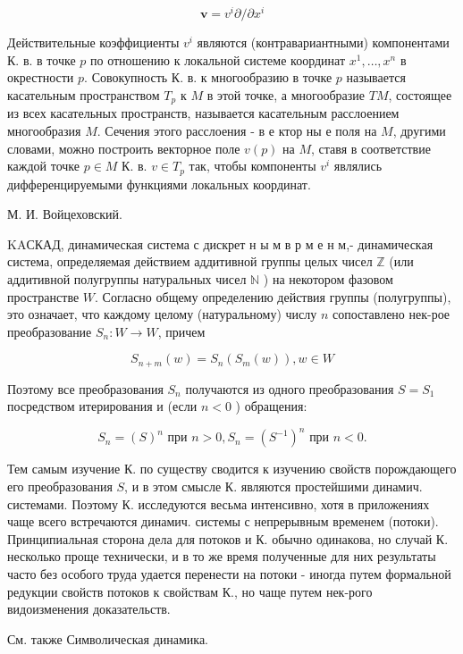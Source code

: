\documentclass[10pt]{article}
\begin{document}
\[

\boldsymbol{v}=v^{i} \partial / \partial x^{i}

\]



Действительные коэффициенты $v^{i}$ являются (контравариантными) компонентами К. в. в точке $p$ по отношению к локальной системе координат $x^{1}, \ldots, x^{n}$ в окрестности $p$. Совокупность К. в. к многообразию в точке $p$ называется касательным пространством $T_{p}$ к $M$ в этой точке, а многообразие $T M$, состоящее из всех касательных пространств, называется касательным расслоением многообразия $M$. Сечения этого расслоения - в е ктор ны е поля на $M$, другими словами, можно построить векторное поле $v(p)$ на $M$, ставя в соответствие каждой точке $p \in M$ К. в. $v \in T_{p}$ так, чтобы компоненты $v^{i}$ являлись дифференцируемыми функциями локальных координат.



М. И. Войцеховский.



KAСКАД, динамическая система с дискрет н ы м в р м е н м,- динамическая система, определяемая действием аддитивной группы целых чисел $\mathbb{Z}$ (или аддитивной полугруппы натуральных чисел $\mathbb{N}$ ) на некотором фазовом пространстве $W$. Согласно общему определению действия группы (полугруппы), это означает, что каждому целому (натуральному) числу $n$ сопоставлено нек-рое преобразование $S_{n}: W \rightarrow W$, причем



\[

S_{n+m}(w)=S_{n}\left(S_{m}(w)\right), w \in W

\]



Поэтому все преобразования $S_{n}$ получаются из одного преобразования $S=S_{1}$ посредством итерирования и (если $n<0$ ) обращения:



\[

S_{n}=(S)^{n} \text { при } n>0, S_{n}=\left(S^{-1}\right)^{n} \text { при } n<0 .

\]



Тем самым изучение К. по существу сводится к изучению свойств порождающего его преобразования $S$, и в этом смысле К. являются простейшими динамич. системами. Поэтому К. исследуются весьма интенсивно, хотя в приложениях чаще всего встречаются динамич. системы с непрерывным временем (потоки). Принципиальная сторона дела для потоков и К. обычно одинакова, но случай К. несколько проще технически, и в то же время полученные для них результаты часто без особого труда удается перенести на потоки - иногда путем формальной редукции свойств потоков к свойствам К., но чаще путем нек-рого видоизменения доказательств.



См. также Символическая динамика.
\end{document}
